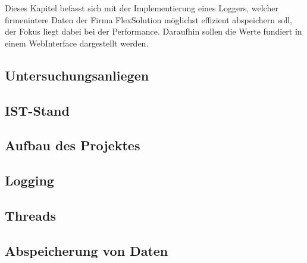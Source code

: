 Dieses Kapitel befasst sich mit der Implementierung eines Loggers, welcher firmenintere Daten der Firma FlexSolution möglichst effizient abspeichern soll, der Fokus liegt dabei bei der Performance. Daraufhin sollen die Werte fundiert in einem WebInterface dargestellt werden.

\begin{spacing}{1}
    \section{Untersuchungsanliegen}\label{section:untersuchungsanliegenFlexlogger}
    \end{spacing}


\begin{spacing}{1}
    \section{IST-Stand}\label{section:ist-standFlexlogger}
    \end{spacing}


\begin{spacing}{1}
    \section{Aufbau des Projektes}\label{section:aufbaudesProjektesFlexlogger}
    \end{spacing}


\begin{spacing}{1}
    \section{Logging}\label{section:logging}
    \end{spacing}


\newpage

\begin{spacing}{1}
    \section{Threads}\label{section:threads}
    \end{spacing}


%

\begin{spacing}{1}
    \section{Abspeicherung von Daten}\label{section:savedata}
    \end{spacing}

